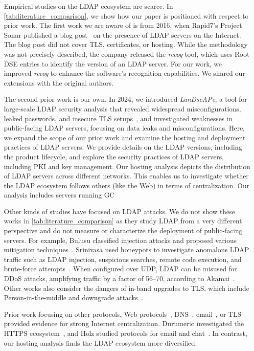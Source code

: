 
Empirical studies on the \gls{LDAP} ecosystem are scarce. In \cref{tab:literature_comparison}, we show how our paper is positioned with respect to prior work.
The first work we are aware of is from 2016, when Rapid7's Project Sonar published a blog post~\cite{project_sonar_rapid7} on the presence of \gls{LDAP} servers on the Internet. The blog post did not cover \gls{TLS}, certificates, or hosting.
While the methodology was not precisely described, the company released the \textit{recog} tool, which uses Root DSE entries to identify the version of an \gls{LDAP} server. For our work, we improved \textit{recog} to enhance the software's recognition capabilities. We shared our extensions with the original authors.

The second prior work is our own. In 2024, we introduced \emph{LanDscAPe}, a tool for large-scale \gls{LDAP} security analysis that revealed widespread misconfigurations, leaked passwords, and insecure \gls{TLS} setups~\cite{landscape}, and investigated weaknesses in public-facing \gls{LDAP} servers, focusing on data leaks and misconfigurations.
Here, we expand the scope of our prior work and examine the hosting and deployment practices of \gls{LDAP} servers.
We provide details on the \gls{LDAP} versions, including the product lifecycle, and explore the security practices of \gls{LDAP} servers, including PKI and key management. Our hosting analysis depicts the distribution of \gls{LDAP} servers across different networks. This enables us to investigate whether the \gls{LDAP} ecosystem follows others (like the Web) in terms of centralization. Our analysis includes servers running \gls{GC}

Other kinds of studies have focused on \gls{LDAP} attacks. We do not show these works in \cref{tab:literature_comparison} as they study \gls{LDAP} from a very different perspective and do not measure or characterize the deployment of public-facing servers. For example, Bulusu \etal classified injection attacks and proposed various mitigation techniques~\cite{7210446}. Srinivasa \etal used honeypots to investigate anomalous \gls{LDAP} traffic such as \gls{LDAP} injection, suspicious searches, remote code execution, and brute-force attempts~\cite{9799363}.
When configured over UDP, \gls{LDAP} can be misused for \gls{DDoS} attacks, amplifying traffic by a factor of 56–70, according to Akamai~\cite{WhatCLDAPReflection}. Other works also consider the dangers of in-band upgrades to \gls{TLS}, which include Person-in-the-middle and downgrade attacks~\cite{274731,10.1145/2815675.2815695}.

Prior work focusing on other protocols, Web protocols~\cite{doan2022}, DNS~\cite{Moura2015}, email~\cite{liuWhoGotYour2021}, or \gls{TLS} ~\cite{holz2020} provided evidence for strong Internet centralization. Durumeric \etal investigated the HTTPS ecosystem~\cite{10.1145/2504730.2504755}, and Holz \etal studied protocols for email and chat~\cite{holz2016}.
In contrast, our hosting analysis finds the \gls{LDAP} ecosystem more diversified.
